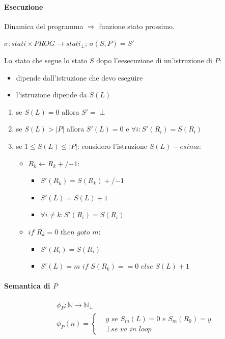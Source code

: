 \documentclass{article}
\begin{document}
\paragraph{Esecuzione}
Dinamica del programma $\Rightarrow$ funzione stato prossimo.



$\sigma: \textit{stati} \times \textit{PROG} \rightarrow \textit{stati}_{\perp}$; $\sigma(S,P)=S'$



Lo stato che segue lo stato $S$ dopo l'eesecuzione di un'istruzione di $P$:
\begin{itemize}
	\item dipende dall'istruzione che devo eseguire
	\item l'istruzione dipende da $S(L)$
\end{itemize}

\begin{enumerate}
	\item se $S(L)=0$ allora $S'=\perp$
	\item se $S(L) > |P|$ allora $S'(L)=0$ e $\forall i: S'(R_i)=S(R_i)$
	\item se $1 \leq S(L) \leq |P|$: considero l'istruzione $S(L)-esima$:
		\begin{itemize}
			\item $R_k \leftarrow R_k +/\dot{-}1$:
			\begin{itemize}
				\item $S'(R_k)=S(R_k) +/\dot{-}1$
				\item $S'(L)=S(L)+1$
				\item $\forall i \neq k: S'(R_i)=S(R_i)$
			\end{itemize}
			\item $\textit{if } R_k=0 \textit{ then goto }m$:
			\begin{itemize}
				\item $S'(R_i)=S(R_i)$
				\item $S'(L)=m \textit{ if } S(R_k)==0 \textit{ else } S(L)+1$
				
			\end{itemize}
			
		\end{itemize}
\end{enumerate}
\paragraph{Semantica di $P$}

\begin{displaymath}
	\begin{split}
		&\phi_P:\mathbb{N} \rightarrow \mathbb{N}_{\perp} \\
		&\phi_P(n) = 
		\begin{cases}
			&y \textit{ se } S_m(L)=0 \textit{ e } S_m(R_0)=y \\
			&\perp \textit{se va in loop}
		\end{cases}
	\end{split}
\end{displaymath}
\end{document}
